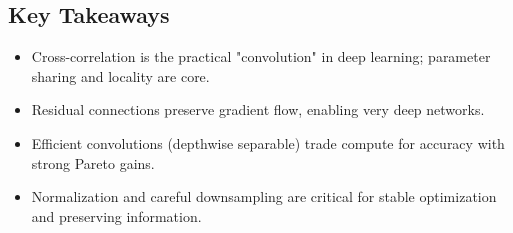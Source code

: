 \subsection*{Key Takeaways}
\begin{itemize}
    \item Cross-correlation is the practical "convolution" in deep learning; parameter sharing and locality are core.
    \item Residual connections preserve gradient flow, enabling very deep networks.
    \item Efficient convolutions (depthwise separable) trade compute for accuracy with strong Pareto gains.
    \item Normalization and careful downsampling are critical for stable optimization and preserving information.
\end{itemize}


